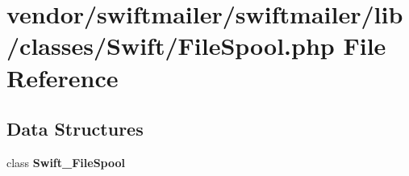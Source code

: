 \section{vendor/swiftmailer/swiftmailer/lib/classes/\+Swift/\+File\+Spool.php File Reference}
\label{_file_spool_8php}
\subsection*{Data Structures}
\begin{DoxyCompactItemize}
\item 
class {\bf Swift\+\_\+\+File\+Spool}
\end{DoxyCompactItemize}
